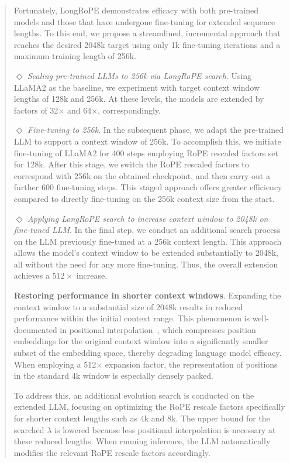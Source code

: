 \begin{abstract}
Fortunately, LongRoPE demonstrates efficacy with both pre-trained models and those that have undergone fine-tuning for extended sequence lengths. To this end, we propose a streamlined, incremental approach that reaches the desired 2048k target using only 1k fine-tuning iterations and a maximum training length of 256k.

$\Diamond$ \textit{Scaling pre-trained LLMs to 256k via LongRoPE search}. Using LLaMA2 as the baseline, we experiment with target context window lengths of 128k and 256k. At these levels, the models are extended by factors of 32$\times$ and 64$\times$, correspondingly.

$\Diamond$ \textit{Fine-tuning to 256k}. In the subsequent phase, we adapt the pre-trained LLM to support a context window of 256k. To accomplish this, we initiate fine-tuning of LLaMA2 for 400 steps employing RoPE rescaled factors set for 128k. After this stage, we switch the RoPE rescaled factors to correspond with 256k on the obtained checkpoint, and then carry out a further 600 fine-tuning steps. This staged approach offers greater efficiency compared to directly fine-tuning on the 256k context size from the start.

$\Diamond$ \textit{Applying LongRoPE search to increase context window to 2048k on fine-tuned LLM}. In the final step, we conduct an additional search process on the LLM previously fine-tuned at a 256k context length. This approach allows the model’s context window to be extended substantially to 2048k, all without the need for any more fine-tuning. Thus, the overall extension achieves a $512\times$ increase.

\textbf{Restoring performance in shorter context windows}. Expanding the context window to a substantial size of 2048k results in reduced performance within the initial context range. This phenomenon is well-documented in positional interpolation~\cite{pi}, which compresses position embeddings for the original context window into a significantly smaller subset of the embedding space, thereby degrading language model efficacy. When employing a 512$\times$ expansion factor, the representation of positions in the standard 4k window is especially densely packed.

To address this, an additional evolution search is conducted on the extended LLM, focusing on optimizing the RoPE rescale factors specifically for shorter context lengths such as 4k and 8k. The upper bound for the searched $\lambda$ is lowered because less positional interpolation is necessary at these reduced lengths. When running inference, the LLM automatically modifies the relevant RoPE rescale factors accordingly.


\end{abstract}
